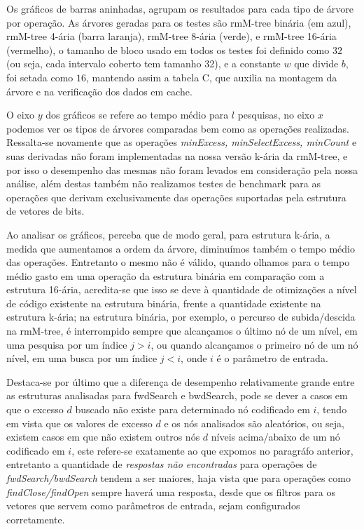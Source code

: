 Os gráficos de barras aninhadas, agrupam os resultados para cada tipo
de árvore por operação. As árvores geradas para os testes são rmM-tree binária (em azul), rmM-tree 4-ária (barra laranja), 
rmM-tree 8-ária (verde), e rmM-tree 16-ária (vermelho), o tamanho de bloco usado em todos os testes foi definido como $32$ (ou seja, cada intervalo coberto tem tamanho 32),
e a constante $w$ que divide $b$, foi setada como $16$, mantendo assim a tabela C, que auxilia na montagem da árvore e na verificação dos dados em cache.


O eixo $y$ dos gráficos se refere ao tempo médio para $l$ pesquisas, no eixo $x$ podemos ver os tipos de árvores comparadas bem como as operações realizadas. 
Ressalta-se novamente que as operações \textit{minExcess, minSelectExcess, minCount} e suas derivadas não foram implementadas na nossa versão k-ária da rmM-tree, e por isso o desempenho das mesmas não foram 
levados em consideração pela nossa análise, além destas também não realizamos testes de benchmark para as operações que derivam exclusivamente das operações suportadas pela estrutura de vetores de bits.

Ao analisar os gráficos, perceba que de modo geral, para estrutura k-ária, a medida que aumentamos a ordem da árvore, diminuímos também o tempo médio das operações. 
Entretanto o mesmo não é válido, quando olhamos para o tempo médio gasto em uma operação da estrutura binária em comparação com a estrutura 16-ária, 
acredita-se que isso se deve à quantidade de otimizações a nível de código existente na estrutura binária, frente a quantidade existente na estrutura k-ária; 
na estrutura binária, por exemplo, o percurso de subida/descida na rmM-tree, é interrompido sempre que alcançamos o último nó de um nível, 
em uma pesquisa por um índice $j>i$, ou quando alcançamos o primeiro nó de um nó nível, em uma busca por um índice $j<i$, onde $i$ é o parâmetro de entrada.

Destaca-se por último que a diferença de desempenho relativamente grande entre as estruturas analisadas para fwdSearch e bwdSearch, pode se dever a casos em que o excesso $d$ buscado não existe para determinado nó codificado em $i$, 
tendo em vista que os valores de excesso $d$ e os nós analisados  são aleatórios, ou seja, existem casos em que não existem outros nós $d$ níveis acima/abaixo de um nó codificado em $i$, 
este refere-se exatamente ao que expomos no paragráfo anterior, entretanto a quantidade de \textit{respostas não encontradas} para operações de \textit{fwdSearch/bwdSearch} tendem a ser maiores, haja 
vista que para operações como \textit{findClose/findOpen} sempre haverá uma resposta, desde que os filtros para os vetores que servem como parâmetros de entrada, sejam configurados corretamente.
\newpage

